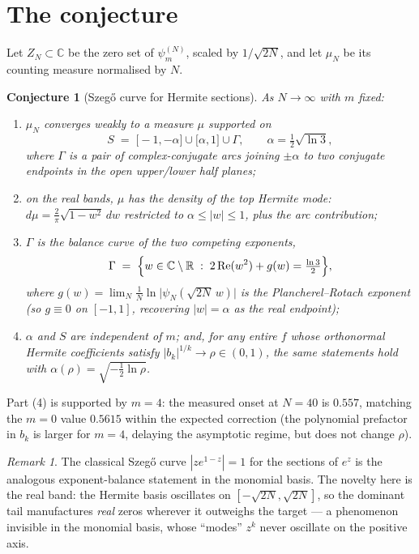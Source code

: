 \documentclass[11pt]{article}
\newtheorem{conjecture}[theorem]{Conjecture}
\theoremstyle{remark}
\newtheorem{remark}[theorem]{Remark}
\newcommand{\R}{\mathbb{R}}
\begin{document}
\section{The conjecture}

Let $Z_N \subset \mathbb{C}$ be the zero set of $\psi_m^{(N)}$, scaled by $1/\sqrt{2N}$, and let $\mu_N$ be its counting measure normalised by $N$.

\begin{conjecture}[Szeg\H{o} curve for Hermite sections]
As $N \to \infty$ with $m$ fixed:
\begin{enumerate}
\item $\mu_N$ converges weakly to a measure $\mu$ supported on
\[
S \;=\; \bigl[-1, -\alpha\bigr] \cup \bigl[\alpha, 1\bigr] \cup \Gamma,
\qquad \alpha = \tfrac12\sqrt{\ln 3},
\]
where $\Gamma$ is a pair of complex-conjugate arcs joining $\pm\alpha$ to two conjugate endpoints in the open upper/lower half planes;
\item on the real bands, $\mu$ has the density of the top Hermite mode: $d\mu = \frac{2}{\pi}\sqrt{1 - w^2}\, dw$ restricted to $\alpha \le |w| \le 1$, plus the arc contribution;
\item $\Gamma$ is the balance curve of the two competing exponents,
\[
\Gamma \;=\; \Bigl\{ w \in \mathbb{C} \setminus \R \;:\; 2\operatorname{Re}(w^2) + g(w) = \tfrac{\ln 3}{2} \Bigr\},
\]
where $g(w) = \lim_N \frac1N \ln \bigl|\psi_N(\sqrt{2N}\,w)\bigr|$ is the Plancherel--Rotach exponent (so $g \equiv 0$ on $[-1,1]$, recovering $|w| = \alpha$ as the real endpoint);
\item $\alpha$ and $S$ are independent of $m$; and, for any entire $f$ whose orthonormal Hermite coefficients satisfy $|b_k|^{1/k} \to \rho \in (0,1)$, the same statements hold with $\alpha(\rho) = \sqrt{-\tfrac{1}{2}\ln\rho}$.
\end{enumerate}
\end{conjecture}

Part (4) is supported by $m = 4$: the measured onset at $N = 40$ is $0.557$, matching the $m=0$ value $0.5615$ within the expected correction (the polynomial prefactor in $b_k$ is larger for $m = 4$, delaying the asymptotic regime, but does not change $\rho$).

\begin{remark}
The classical Szeg\H{o} curve $|z e^{1-z}| = 1$ for the sections of $e^z$ is the analogous exponent-balance statement in the monomial basis. The novelty here is the real band: the Hermite basis oscillates on $[-\sqrt{2N}, \sqrt{2N}]$, so the dominant tail manufactures \emph{real} zeros wherever it outweighs the target --- a phenomenon invisible in the monomial basis, whose ``modes'' $z^k$ never oscillate on the positive axis.
\end{remark}
\end{document}
